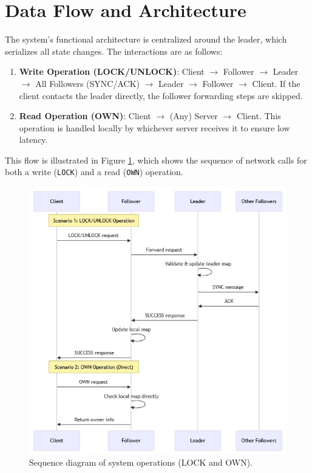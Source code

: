 \documentclass[a4paper,11pt]{article}
\begin{document}
\section{Data Flow and Architecture}
The system's functional architecture is centralized around the leader, which serializes all state changes. The interactions are as follows:

\begin{enumerate}
    \item \textbf{Write Operation (LOCK/UNLOCK)}: Client $\rightarrow$ Follower $\rightarrow$ Leader $\rightarrow$ All Followers (SYNC/ACK) $\rightarrow$ Leader $\rightarrow$ Follower $\rightarrow$ Client. If the client contacts the leader directly, the follower forwarding steps are skipped.
    \item \textbf{Read Operation (OWN)}: Client $\rightarrow$ (Any) Server $\rightarrow$ Client. This operation is handled locally by whichever server receives it to ensure low latency.
\end{enumerate}

This flow is illustrated in Figure \ref{fig:mermaid}, which shows the sequence of network calls for both a write (\texttt{LOCK}) and a read (\texttt{OWN}) operation.

\begin{figure}[htbp]
    \centering
    \includegraphics[width=0.85\linewidth]{images/mermaid.JPG}
    \caption{Sequence diagram of system operations (LOCK and OWN).}
    \label{fig:mermaid}
\end{figure}
\end{document}
